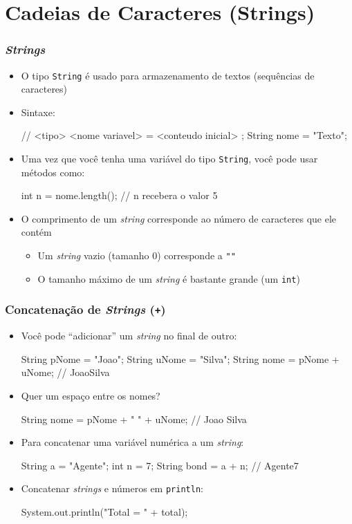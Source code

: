 \documentclass[xcolor={dvipsnames,table},aspectratio=169]{beamer}
\begin{document}
\section{Cadeias de Caracteres (Strings)}

\begin{frame}[fragile]\frametitle{\emph{Strings}}
\begin{itemize}
	\item O tipo \texttt{String} é usado para armazenamento de textos (sequências de caracteres)
	\item Sintaxe:
{\small
\begin{javacode}
// <tipo> <nome variavel> = <conteudo inicial> ;
String nome = "Texto";
\end{javacode}
}
	\item Uma vez que você tenha uma variável do tipo \texttt{String}, você pode usar métodos como:
{\small
\begin{javacode}
int n = nome.length(); // n recebera o valor 5
\end{javacode}
}
	\item O comprimento de um \emph{string} corresponde ao número de caracteres que ele contém
	\begin{itemize}
		\item Um \emph{string} vazio (tamanho 0) corresponde a \texttt{"}\texttt{"}
		\item O tamanho máximo de um \emph{string} é bastante grande (um \texttt{int})
	\end{itemize}
\end{itemize}
\end{frame}

\begin{frame}[fragile]\frametitle{Concatenação de \emph{Strings} (\texttt{+})}
\begin{itemize}
	\item Você pode ``adicionar'' um \emph{string} no final de outro:
{\scriptsize
\begin{javacode}
String pNome = "Joao";
String uNome = "Silva";
String nome = pNome + uNome; // JoaoSilva
\end{javacode}
}
	\item Quer um espaço entre os nomes?
{\scriptsize
\begin{javacode}
String nome = pNome + " " + uNome; // Joao Silva
\end{javacode}
}
	\item Para concatenar uma variável numérica a um \emph{string}:
{\scriptsize
\begin{javacode}
String a = "Agente";
int n = 7;
String bond = a + n; // Agente7
\end{javacode}
}
	\item Concatenar \emph{strings} e números em \texttt{println}:
{\scriptsize
\begin{javacode}
System.out.println("Total = " + total);
\end{javacode}
}
\end{itemize}
\end{frame}
\end{document}
